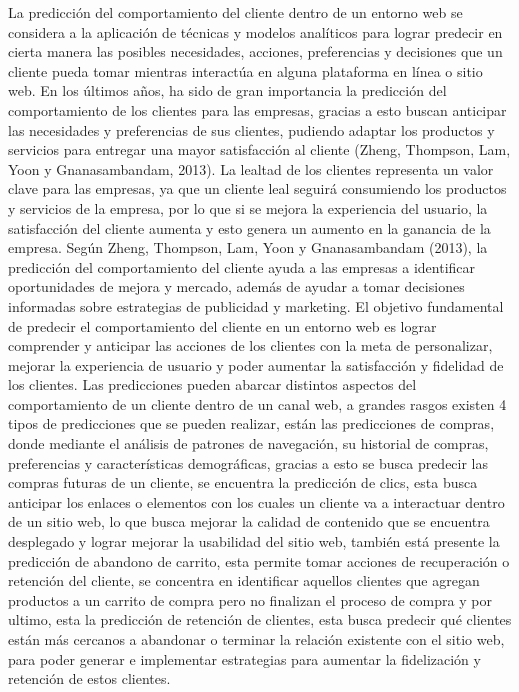 La predicción del comportamiento del cliente dentro de un entorno web se considera a la aplicación de técnicas y modelos analíticos para lograr predecir en cierta manera las posibles necesidades, acciones, preferencias y decisiones que un cliente pueda tomar mientras interactúa en alguna plataforma en línea o sitio web. En los últimos años, ha sido de gran importancia la predicción del comportamiento de los clientes para las empresas, gracias a esto buscan anticipar las necesidades y preferencias de sus clientes, pudiendo adaptar los productos y servicios para entregar una mayor satisfacción al cliente (Zheng, Thompson, Lam, Yoon y Gnanasambandam, 2013). La lealtad de los clientes representa un valor clave para las empresas, ya que un cliente leal seguirá consumiendo los productos y servicios de la empresa, por lo que si se mejora la experiencia del usuario, la satisfacción del cliente aumenta y esto genera un aumento en la ganancia de la empresa. 
Según Zheng, Thompson, Lam, Yoon y Gnanasambandam (2013), la predicción del comportamiento del cliente ayuda a las empresas a identificar oportunidades de mejora y mercado, además de ayudar a tomar decisiones informadas sobre estrategias de publicidad y marketing. El objetivo fundamental de predecir el comportamiento del cliente en un entorno web es lograr comprender y anticipar las acciones de los clientes con la meta de personalizar, mejorar la experiencia de usuario y poder aumentar la satisfacción y fidelidad de los clientes. 
Las predicciones pueden abarcar distintos aspectos del comportamiento de un cliente dentro de un canal web, a grandes rasgos existen 4 tipos de predicciones que se pueden realizar, están las predicciones de compras, donde mediante el análisis de patrones de navegación, su historial de compras, preferencias y características demográficas, gracias a esto se busca predecir las compras futuras de un cliente, se encuentra la predicción de clics, esta busca anticipar los enlaces o elementos con los cuales un cliente va a interactuar dentro de un sitio web, lo que busca mejorar la calidad de contenido que se encuentra desplegado y lograr mejorar la usabilidad del sitio web, también está presente la predicción de abandono de carrito, esta permite tomar acciones de recuperación o retención del cliente, se concentra en identificar aquellos clientes que agregan productos a un carrito de compra pero no finalizan el proceso de compra y por ultimo, esta la predicción de retención de clientes, esta busca predecir qué clientes están más cercanos a abandonar o terminar la relación existente con el sitio web, para poder generar e implementar estrategias para aumentar la fidelización y retención de estos clientes. 


